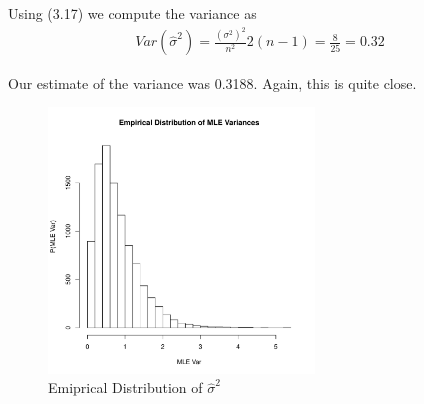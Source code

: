 \documentclass[paper=a4, fontsize=11pt]{scrartcl} %
\numberwithin{equation}{section} %
\numberwithin{figure}{section} %
\numberwithin{table}{section} %
\begin{document}
Using (3.17) we compute the variance as 
\begin{align*}
Var(\hat{\sigma}^2) = \frac{(\sigma^2)^2}{n^2}2(n-1) = \frac{8}{25}=0.32
\end{align*}

Our estimate of the variance was 0.3188. Again, this is quite close.

\begin{figure}
	\centering
	\includegraphics[width=200pt]{hist.png}
	\caption{Emiprical Distribution of $\hat{\sigma}^2$}
\end{figure}
\end{document}
